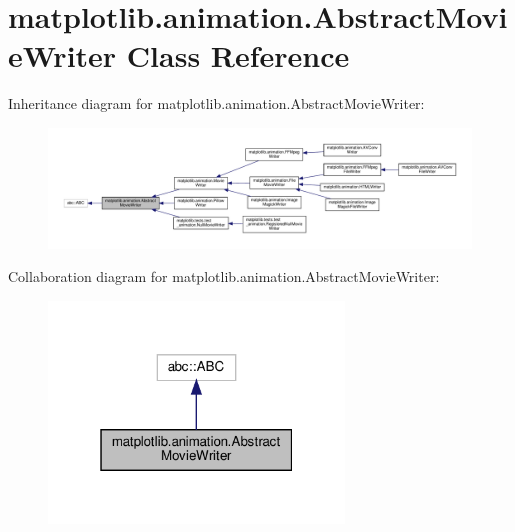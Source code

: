 \hypertarget{classmatplotlib_1_1animation_1_1AbstractMovieWriter}{}\section{matplotlib.\+animation.\+Abstract\+Movie\+Writer Class Reference}
\label{classmatplotlib_1_1animation_1_1AbstractMovieWriter}


Inheritance diagram for matplotlib.\+animation.\+Abstract\+Movie\+Writer\+:
\nopagebreak
\begin{figure}[H]
\begin{center}
\leavevmode
\includegraphics[width=350pt]{classmatplotlib_1_1animation_1_1AbstractMovieWriter__inherit__graph}
\end{center}
\end{figure}


Collaboration diagram for matplotlib.\+animation.\+Abstract\+Movie\+Writer\+:
\nopagebreak
\begin{figure}[H]
\begin{center}
\leavevmode
\includegraphics[width=223pt]{classmatplotlib_1_1animation_1_1AbstractMovieWriter__coll__graph}
\end{center}
\end{figure}
